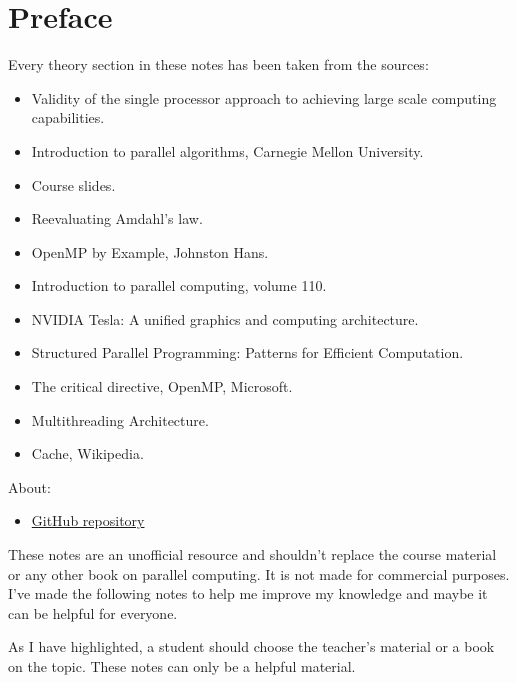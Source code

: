 \section*{Preface}

Every theory section in these notes has been taken from the sources:
\begin{itemize}
    \item Validity of the single processor approach to achieving large scale computing capabilities.\cite{amdahl2007validity}
    \item Introduction to parallel algorithms, Carnegie Mellon University.\cite{introductionToParallelAlgorithmsUMD}
    \item Course slides.\cite{parallel-computing-polimi}
    \item Reevaluating Amdahl's law.\cite{gustafson1988reevaluating}
    \item OpenMP by Example, Johnston Hans.\cite{whatIsOpenMPumassJohnstonHans}
    \item Introduction to parallel computing, volume 110.\cite{kumar1994introduction}
    \item NVIDIA Tesla: A unified graphics and computing architecture.\cite{lindholm2008nvidia}
    \item Structured Parallel Programming: Patterns for Efficient Computation.\cite{mccool2012structured}
    \item The critical directive, OpenMP, Microsoft.\cite{openMPCriticalDirectiveMicrosoftExample}
    \item Multithreading Architecture.\cite{nemirovsky2022multithreading}
    \item Cache, Wikipedia.\cite{wikipediaCacheResearch}
\end{itemize}
About:
\begin{itemize}
    \item[\faIcon{github}] \href{https://github.com/PoliMI-HPC-E-notes-projects-AndreVale69/HPC-E-PoliMI-university-notes}{GitHub repository}
\end{itemize}
These notes are an unofficial resource and shouldn't replace the course material or any other book on parallel computing. It is not made for commercial purposes. I've made the following notes to help me improve my knowledge and maybe it can be helpful for everyone.

As I have highlighted, a student should choose the teacher's material or a book on the topic. These notes can only be a helpful material.